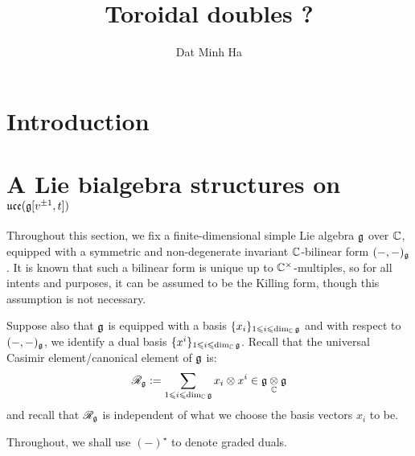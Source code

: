 

\setcounter{section}{-1}





    \title{Toroidal doubles ?}
    
    \author{Dat Minh Ha}
    \maketitle
    
    \begin{abstract}
    
    \end{abstract}
    
    {
    \hypersetup{} 
    \tableofcontents %
    \listoftodos
    }

    \section{Introduction}

    \section{A Lie bialgebra structures on \texorpdfstring{$\mathfrak{uce}( \mathfrak{g}[v^{\pm 1}, t] )$}{}}
        \begin{convention} \label{conv: a_fixed_finite_dimensional_simple_lie_algebra}
            Throughout this section, we fix a finite-dimensional simple Lie algebra $\mathfrak{g}$ over $\mathbb{C}$, equipped with a symmetric and non-degenerate invariant $\mathbb{C}$-bilinear form $(-, -)_{\mathfrak{g}}$. It is known that such a bilinear form is unique up to $\bbC^{\x}$-multiples, so for all intents and purposes, it can be assumed to be the Killing form, though this assumption is not necessary. 

            Suppose also that $\mathfrak{g}$ is equipped with a basis $\{x_i\}_{1 \leqslant i \leqslant \dim_{\mathbb{C}} \mathfrak{g}}$ and with respect to $(-, -)_{\mathfrak{g}}$, we identify a dual basis $\{x^i\}_{1 \leqslant i \leqslant \dim_{\mathbb{C}} \mathfrak{g}}$. Recall that the universal Casimir element/canonical element of $\mathfrak{g}$ is:
                $$\scrR_{\g} := \sum_{1 \leq i \leq \dim_{\bbC} \g} x_i \tensor x^i \in \g \tensor_{\bbC} \g$$
            and recall that $\mathscr{R}_{\mathfrak{g}}$ is independent of what we choose the basis vectors $x_i$ to be.
        \end{convention}

        \begin{convention}
            Throughout, we shall use $(-)^{\star}$ to denote graded duals. 
        \end{convention}

